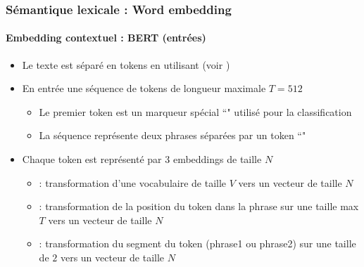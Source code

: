 \documentclass[xcolor=table]{beamer}
\begin{document}
\begin{frame}
\frametitle{Sémantique lexicale : Word embedding}
\framesubtitle{Embedding contextuel : BERT (entrées)}
	
\begin{itemize}
	\item Le texte est séparé en tokens en utilisant  (voir \cite{2016-wu-al})
	\item En entrée une séquence de tokens de longueur maximale $T = 512$
	\begin{itemize}
		\item Le premier token est un marqueur spécial ``\keyword{[CLS]}" utilisé pour la classification
		\item La séquence représente deux phrases séparées par un token ``\keyword{[SEP]}"
	\end{itemize}
	\item Chaque token est représenté par 3 embeddings de taille $N$ 
	\begin{itemize}
		\item {} : transformation d'une vocabulaire de taille $V$ vers un vecteur de taille $N$
		\item {} : transformation de la position du token dans la phrase sur une taille max $T$ vers un vecteur de taille $N$
		\item {} : transformation du segment du token (phrase1 ou phrase2) sur une taille de $2$ vers un vecteur de taille $N$
	\end{itemize}
\end{itemize}
	
\end{frame}
\end{document}
